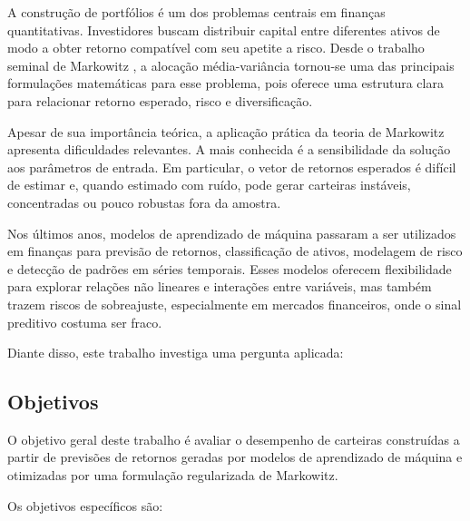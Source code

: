 \documentclass[12pt,a4paper]{article}
\begin{document}
A construção de portfólios é um dos problemas centrais em finanças quantitativas. Investidores buscam distribuir capital entre diferentes ativos de modo a obter retorno compatível com seu apetite a risco. Desde o trabalho seminal de Markowitz \cite{markowitz1952}, a alocação média-variância tornou-se uma das principais formulações matemáticas para esse problema, pois oferece uma estrutura clara para relacionar retorno esperado, risco e diversificação.

Apesar de sua importância teórica, a aplicação prática da teoria de Markowitz apresenta dificuldades relevantes. A mais conhecida é a sensibilidade da solução aos parâmetros de entrada. Em particular, o vetor de retornos esperados é difícil de estimar e, quando estimado com ruído, pode gerar carteiras instáveis, concentradas ou pouco robustas fora da amostra.

Nos últimos anos, modelos de aprendizado de máquina passaram a ser utilizados em finanças para previsão de retornos, classificação de ativos, modelagem de risco e detecção de padrões em séries temporais. Esses modelos oferecem flexibilidade para explorar relações não lineares e interações entre variáveis, mas também trazem riscos de sobreajuste, especialmente em mercados financeiros, onde o sinal preditivo costuma ser fraco.

Diante disso, este trabalho investiga uma pergunta aplicada:

\begin{center}
\end{center}

\subsection{Objetivos}

O objetivo geral deste trabalho é avaliar o desempenho de carteiras construídas a partir de previsões de retornos geradas por modelos de aprendizado de máquina e otimizadas por uma formulação regularizada de Markowitz.

Os objetivos específicos são:
\end{document}
